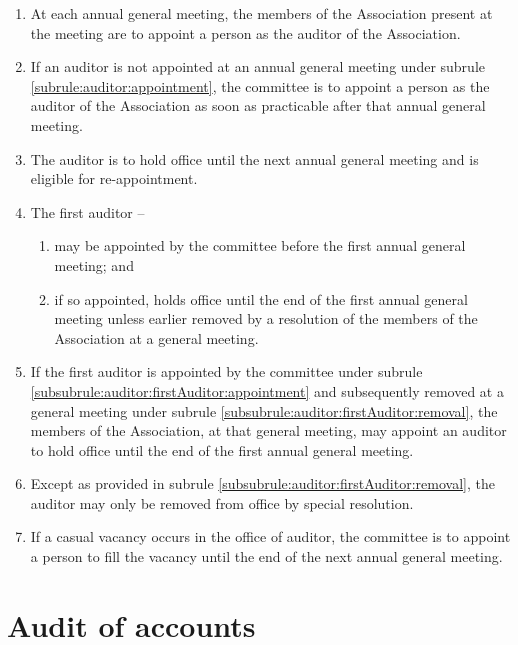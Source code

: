 \documentclass[a4paper,11pt]{article}
\begin{document}
\begin{enumerate}
	\item \label{subrule:auditor:appointment} At each annual general meeting, the members of the Association present at the meeting are to appoint a person as the auditor of the Association.
	\item If an auditor is not appointed at an annual general meeting under subrule \ref{subrule:auditor:appointment}, the committee is to appoint a person as the auditor of the Association as soon as practicable after that annual general meeting.
	\item The auditor is to hold office until the next annual general meeting and is eligible for re-appointment.
	
	\item \label{subrule:auditor:firstAuditor} The first auditor --
	\begin{enumerate}
		\item \label{subsubrule:auditor:firstAuditor:appointment} may be appointed by the committee before the first annual general meeting; and	
		\item \label{subsubrule:auditor:firstAuditor:removal} if so appointed, holds office until the end of the first annual general meeting unless earlier removed by a resolution of the members of the Association at a general meeting.
	\end{enumerate}

	\item If the first auditor is appointed by the committee under subrule \ref{subsubrule:auditor:firstAuditor:appointment} and subsequently removed at a general meeting under subrule \ref{subsubrule:auditor:firstAuditor:removal}, the members of the Association, at that general meeting, may appoint an auditor to hold office until the end of the first annual general meeting.
	\item Except as provided in subrule \ref{subsubrule:auditor:firstAuditor:removal}, the auditor may only be removed from office by special resolution.
	\item If a casual vacancy occurs in the office of auditor, the committee is to appoint a person to fill the vacancy until the end of the next annual general meeting.
\end{enumerate}

\section{Audit of accounts}
\label{rule:audits}
\end{document}
